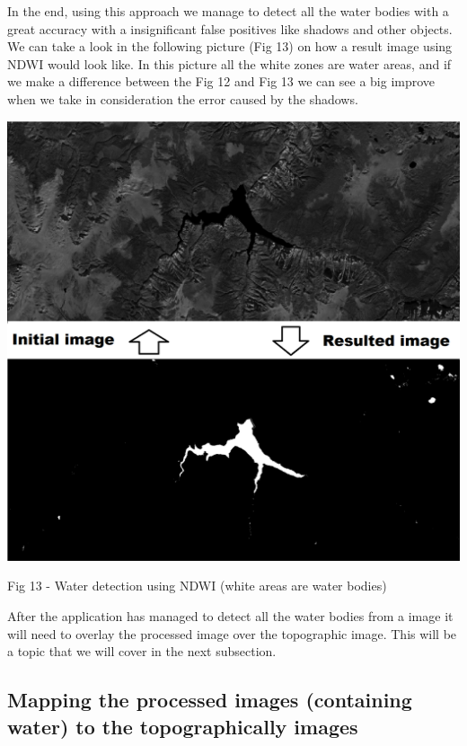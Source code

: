 \documentclass[12pt, a4paper]{report}
\begin{document}
In the end, using this approach we manage to detect all the water bodies with a great accuracy with a insignificant false positives like shadows and other objects. We can take a look in the following picture (Fig 13) on how a result image using NDWI would look like. In this picture all the white zones are water areas, and if we make a difference between the Fig 12 and Fig 13 we can see a big improve when we take in consideration the error caused by the shadows.
\par 


\bigskip
\includegraphics[scale=0.4, left]{NDWI-prediction.png}
\begin{center}
Fig 13 - Water detection using NDWI (white areas are water bodies)
\end{center}
\par 

After the application has managed to detect all the water bodies from a image it will need to overlay the processed image over the topographic image. This will be a topic that we will cover in the next subsection.

\subsection{Mapping the processed images (containing water) to the topographically images}
\end{document}
